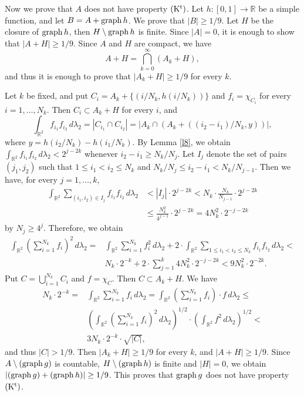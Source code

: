 \documentclass[12pt]{article}
\def\rr{{\mathbb R}}
\def\sik{{\rr}^2}
\def\su{\subset}
\def\se{\setminus}
\def\la{\lambda}
\def\cd{\cdot}
\def\stb{,\ldots ,}
\def\nl{[0,1]}
\def\graph{{\rm graph}\, }
\begin{document}
\bigskip
Now we prove that $A$ does not have property ${\rm (K^t)}$. Let $h\colon \nl
\to \rr$ be a simple function, and let $B=A+\graph h$.
We prove that $|B|\ge 1/9$. Let $H$ be the closure of $\graph h$, then
$H\se \graph h$ is finite. Since $|A|=0$, it is enough to show that
$|A+H|\ge 1/9$. Since $A$ and $H$ are compact, we have
$$A+H=\bigcap_{k=0}^\infty (A_k +H),$$
and thus it is enough to prove that $|A_k +H|\ge 1/9$ for every $k$.

Let $k$ be fixed, and put $C_i =A_k +\{ (i/N_k , h(i/N_k ))\}$ and $f_i =
\chi _{C_i}$ for every $i=1\stb N_k$. Then $C_i \su A_k +H$ for every $i$, and
$$\int_{\sik} f_{i_1} f_{i_2} \, d\la _2 = |C_{i_1} \cap C_{i_2} | =
\left| A_k \cap (A_k +((i_2 -i_1 )/N_k ,y))\right| ,$$
where $y=h(i_2 /N_k )-h(i_1 /N_k )$. By Lemma \ref{l8}, we obtain
$\int_{\sik} f_{i_1} f_{i_2} \, d\la _2 < 2^{j-2k}$ whenever $i_2 -i_1 \ge N_k /N_j$.
Let $I_j$ denote the set of pairs $(j_1 ,j_2 )$ such that $1\le i_1 <i_2
\le N_k$ and $N_k /N_j \le i_2 -i_1 < N_k /N_{j-1}$. Then we have, for every
$j=1\stb k$,
\begin{align*}
\int_{\sik} \sum_{(i_1 ,i_2 )\in I_j} f_{i_1} f_{i_2} \, d\la _2 &<|I_j |\cd 2^{j-2k}
<N_k \cd \frac{N_k}{N_{j-1}} \cd 2^{j-2k}\\
& \le \frac{N_k^2}{4^{j-1}}\cd 2^{j-2k}=4N_k^2 \cd 2^{-j-2k}
\end{align*}
by $N_j \ge 4^j$. Therefore, we obtain
\begin{equation*}\label{10}
\begin{split}
\int_{\sik} \left( \sum_{i=1}^{N_k} f_i \right) ^2 \, d\la _2 =&
\int_{\sik} \sum_{i=1}^{N_k} f^2_i \, d\la _2  +2\cd \int_{\sik}
\sum_{1\le i_1< i_2 \le N_k} f_{i_1} f_{i_2}\, d\la _2  <\\
&N_k \cd 2^{-k} + 2\cd \sum_{j=1}^k 4N_k^2 \cd 2^{-j-2k} <9N_k^2 \cd 2^{-2k}.
\end{split}
\end{equation*}
Put $C=\bigcup_{i=1}^{N_k} C_i$ and $f=\chi _C$. Then $C\su A_k +H$. We have
\begin{equation*}\label{e11}
\begin{split}
N_k \cd 2^{-k} =&\int_{\sik} \sum_{i=1}^{N_k} f_i \, d\la _2 =
\int_{\sik} \left( \sum_{i=1}^{N_k} f_i \right) \cd f\, d\la _2 \le \\
&\left( \int_{\sik} \left( \sum_{i=1}^{N_k} f_i \right) ^2 \,
d\la _2 \right)^{1/2} \cd \left( \int_{\sik} f^2 \, d\la _2 \right)^{1/2} <\\
& 3N_k \cd 2^{-k} \cd \sqrt{|C|} ,
\end{split}
\end{equation*}
and thus $|C| >1/9$. Then $|A_k +H|\ge 1/9$ for every $k$,
and $|A +H|\ge 1/9$. Since $A\se (\graph g)$ is countable,
$H\se (\graph h)$ is finite and $|H|=0$, we obtain $|(\graph g) +
(\graph h )|\ge 1/9$. This proves that $\graph g$ does not have property
${\rm (K^t)}$.
\end{document}
